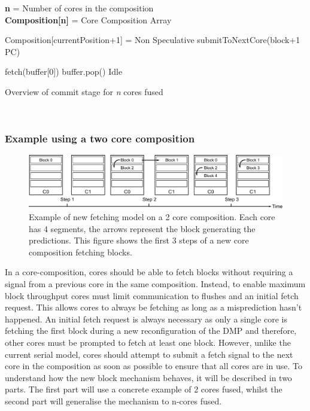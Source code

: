 \begin{algorithm}[t]
\textbf{n} = Number of cores in the composition\\
\textbf{Composition[n]} = Core Composition Array\\

{
	{
		Composition[currentPosition+1] = Non Speculative\;
	}
	{
		submitToNextCore(block+1 PC)
	}
	
	{
		fetch(buffer[0])
		buffer.pop()
	}
	\Else
	{
		Idle
	}
}
\caption{Overview of commit stage for \textit{n} cores fused}~\label{alg:commit}
\end{algorithm}


\subsubsection{Example using a two core composition}

\begin{figure}[t]
    \centering
    \includegraphics[width=1\textwidth]{chapter3/graphics/fetching-model.pdf}

    \caption{Example of new fetching model on a 2 core composition. Each core has 4 segments, the arrows represent the block generating the predictions. This figure shows the first 3 steps of a new core composition fetching blocks.}
    \label{fig:new_fetch_ex}
\vspace{1em}
	\end{figure}
	
In a core-composition, cores should be able to fetch blocks without requiring a signal from a previous core in the same composition.
Instead, to enable maximum block throughput cores must limit communication to flushes and an initial fetch request.
This allows cores to always be fetching as long as a misprediction hasn't happened.
An initial fetch request is always necessary as only a single core is fetching the first block during a new reconfiguration of the DMP and therefore, other cores must be prompted to fetch at least one block.
However, unlike the current serial model, cores should attempt to submit a fetch signal to the next core in the composition as soon as possible to ensure that all cores are in use.
To understand how the new block mechanism behaves, it will be described in two parts.
The first part will use a concrete example of 2 cores fused, whilst the second part will generalise the mechanism to n-cores fused.

